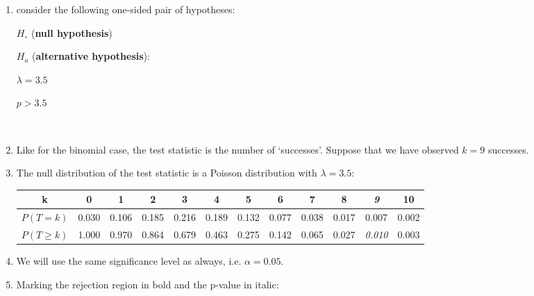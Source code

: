 \begin{enumerate}
\item consider the following one-sided pair of hypotheses:

  \noindent\begin{minipage}{.4\textwidth}
    $H_\circ$ (\textbf{null hypothesis})
    
    \vspace{1em}
    
    $H_a$ (\textbf{alternative hypothesis}):
  \end{minipage}
  \begin{minipage}{.2\textwidth}
  \end{minipage}
  \begin{minipage}{.2\textwidth}
    $\lambda = 3.5$
    
    \vspace{1em}
    
    $p>{3.5}$
  \end{minipage}
  \begin{minipage}{.2\textwidth}
  \end{minipage}\\

\item Like for the binomial case, the test statistic is the number of
  `successes'.  Suppose that we have observed $k=9$ successes.

\item The null distribution of the test statistic is a Poisson
  distribution with $\lambda={3.5}$:\\
  
  \begin{tabular}{c@{~}c@{~}c@{~}c@{~}c@{~}c@{~}c@{~}c@{~}c@{~}c@{~}c@{~}c}
    k & 0 & 1 & 2 & 3 & 4 & 5 & 6 & 7 & 8 & \textit{9} & 10 \\ \hline
    $P(T=k)$ & 0.030 & 0.106 & 0.185 & 0.216 & 0.189 &
    0.132 & 0.077 & 0.038 & 0.017 & 0.007 & 0.002 \\
    $P({T}\geq{k})$ & 1.000 & 0.970 & 0.864 & 0.679 & 0.463 &
    0.275 & 0.142 & 0.065 & 0.027 & \textit{0.010} & 0.003 \\
  \end{tabular}

\item We will use the same significance level as always,
  i.e. $\alpha=0.05$.

\item Marking the rejection region in bold and the p-value in italic:


\end{enumerate}
